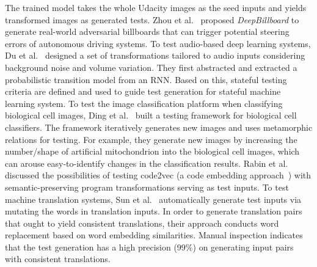 The trained model takes the whole Udacity images as the seed inputs and yields transformed images as generated tests.
Zhou et al.~ proposed \emph{DeepBillboard} to generate real-world adversarial billboards that can trigger potential steering errors of autonomous driving systems.
To test audio-based deep learning systems, Du et al.~ designed a set of transformations tailored to audio inputs considering background noise and volume variation. They first abstracted and extracted a probabilistic transition model from an RNN. Based on this, stateful testing criteria are defined and used to guide test generation for stateful machine learning system.
To test the image classification platform when classifying biological cell images, Ding et al.~ built a testing framework for biological cell classifiers.
The framework iteratively generates new images and uses metamorphic relations for testing.
For example, they generate new images by increasing the number/shape of artificial mitochondrion into the biological cell images, which can arouse easy-to-identify changes in the classification results.
Rabin et al.~ discussed the possibilities of testing code2vec (a code embedding approach~) with semantic-preserving program transformations serving as test inputs.
To test machine translation systems, Sun et al.~ automatically generate test inputs via mutating the words in translation inputs.
In order to generate translation pairs that ought to yield consistent translations, their approach conducts word replacement based on word embedding similarities.
Manual inspection indicates that the test generation has a high precision (99\%) on generating input pairs with consistent translations.

